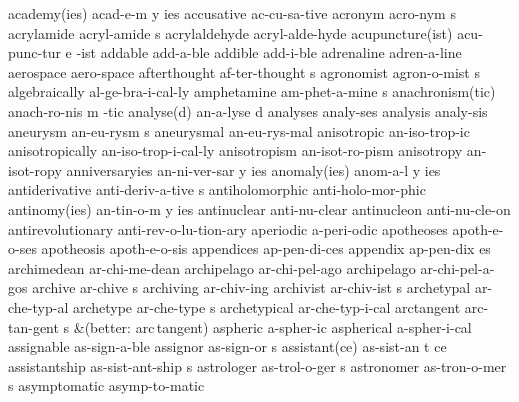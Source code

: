 \begingroup
\eightpoint
\3 academy(ies)		acad-e-m y ies
\1 accusative		ac-cu-sa-tive		%
\5 acronym		acro-nym s		%
\5 acrylamide		acryl-amide s		%
\1 acrylaldehyde	acryl-alde-hyde		%
\3 acupuncture(ist)	acu-punc-tur e -ist	%
\1 addable		add-a-ble
\1 addible		add-i-ble
\1 adrenaline		adren-a-line
\1 aerospace		aero-space
\5 afterthought 	af-ter-thought s
\5 agronomist		agron-o-mist s
\1 algebraically	al-ge-bra-i-cal-ly	%
\5 amphetamine		am-phet-a-mine s
\3 anachronism(tic)	anach-ro-nis m -tic	%
\2 analyse(d)		an-a-lyse d
\1 analyses		analy-ses\thinspace*
\1 analysis		analy-sis		%
\5 aneurysm		an-eu-rysm s		%
\1 aneurysmal		an-eu-rys-mal		%
\1 anisotropic		an-iso-trop-ic		%
\1 anisotropically	an-iso-trop-i-cal-ly	%
\1 anisotropism		an-isot-ro-pism 	%
\1 anisotropy		an-isot-ropy		%
\3 anniversary{ies}	an-ni-ver-sar y ies	%
\3 anomaly(ies)		anom-a-l y ies
\5 antiderivative	anti-deriv-a-tive s
\1 antiholomorphic	anti-holo-mor-phic	%
\3 antinomy(ies)	an-tin-o-m y ies
\1 antinuclear		anti-nu-clear
\1 antinucleon		anti-nu-cle-on
\1 antirevolutionary	anti-rev-o-lu-tion-ary
\1 aperiodic		a-peri-odic		%
\1 apotheoses		apoth-e-o-ses
\1 apotheosis		apoth-e-o-sis
\1 appendices		ap-pen-di-ces		%
\5 appendix		ap-pen-dix es		%
\1 archimedean		ar-chi-me-dean		%
\1 archipelago		ar-chi-pel-ago       %
\1 archipelago		ar-chi-pel-a-gos
\5 archive		ar-chive s              %
\1 archiving		ar-chiv-ing             %
\5 archivist		ar-chiv-ist s           %
\1 archetypal		ar-che-typ-al
\5 archetype		ar-che-type s		%
\1 archetypical		ar-che-typ-i-cal
\5 arctangent		arc-tan-gent s
\tabalign		&\null\quad (better: arc\,tangent)\cr
\1 aspheric		a-spher-ic		%
\1 aspherical		a-spher-i-cal		%
\1 assignable		as-sign-a-ble
\5 assignor		as-sign-or s
\3 assistant(ce)	as-sist-an t ce		%
\5 assistantship	as-sist-ant-ship s
\NewWordtrue
\5 astrologer		as-trol-o-ger s		%
\NewWordtrue
\5 astronomer		as-tron-o-mer s		%
\1 asymptomatic		asymp-to-matic
